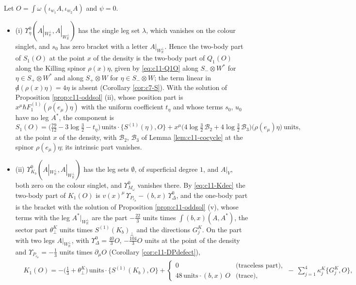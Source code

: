 \begin{proposition}
\label{prop:c11-SKbil}
Let $O=\int\omega\,(\iota_{w_1}A,\iota_{w_2}A)$ and $\psi=0$.
\begin{itemize}
\item (i) $\Upsilon^0_\eta(A|_{W_{\mathbb R}^\perp},A|_{W_{\mathbb R}^\perp})$ has the single leg set $\lambda$, which vanishes on the colour singlet, and $s_0$ has zero bracket with a letter $A|_{W_{\mathbb R}^\perp}$. Hence the two-body part of $S_1(O)$ at the point $x$ of the density is the two-body part of $Q_1(O)$ along the Killing spinor $\rho(x)\eta$, given by \eqref{eq:c11-Q1O} along $S_-\otimes W^*$ for $\eta\in S_+\otimes W^*$ and along $S_+\otimes W$ for $\eta\in S_-\otimes W$; the term linear in ${\not d}(\rho(x)\eta)=4\eta$ is absent (Corollary \ref{cor:c7-S}). With the solution of Proposition \ref{prop:c11-oddsol} (ii), whose position part is $x^\mu\hbar F_1^{(1)}(\rho(e_\mu)\eta)$ with the uniform coefficient $t_\eta$ and whose terms $s_0$, $u_0$ have no leg $A^*$, the component is
\[
S_1(O)=\big(\tfrac{79}{12}-3\log\tfrac32-t_\eta\big)\,\text{units}\cdot\{S^{(1)}(\eta),O\}+x^\mu\Big(4\log\tfrac32\,\mathcal B_2+4\log\tfrac32\,\mathcal B_3\Big)\big(\rho(e_\mu)\eta\big)\ \text{units},
\]
at the point $x$ of the density, with $\mathcal B_2$, $\mathcal B_3$ of Lemma \ref{lem:c11-cocycle} at the spinor $\rho(e_\mu)\eta$; its intrinsic part vanishes.
\item (ii) $\Upsilon^0_{K_b}(A|_{W_{\mathbb R}^\perp},A|_{W_{\mathbb R}^\perp})$ has the leg sets $\emptyset$, of superficial degree $1$, and $A|_V$, both zero on the colour singlet, and $\Upsilon^0_{M_\omega}$ vanishes there. By \eqref{eq:c11-Kdec} the two-body part of $K_1(O)$ is $v(x)^\mu\,\Upsilon_{P_{e_\mu}}-(b,x)\,\Upsilon^0_\Delta$, and the one-body part is the bracket with the solution of Proposition \ref{prop:c11-oddsol} (v), whose terms with the leg $A^*|_{W_{\mathbb R}^\perp}$ are the part $-\tfrac{22}3$ units times $\int(b,x)(A,A^*)$, the sector part $\theta^K_\perp$ units times $S^{(1)}(K_b)_\perp$ and the directions $G^K_j$. On the part with two legs $A|_{W_{\mathbb R}^\perp}$, with $\Upsilon^0_\Delta=\tfrac{40}3O$, $-\tfrac{104}3O$ units at the point of the density and $\Upsilon_{P_{e_\mu}}=-\tfrac13$ units times $\partial_\mu O$ (Corollary \ref{cor:c11-DPdefect}),
\[
\begin{aligned}
&K_1(O)=-\big(\tfrac13+\theta^K_\perp\big)\,\text{units}\cdot\{S^{(1)}(K_b),O\}+\begin{cases}0&\text{(traceless part)},\\ 48\,\text{units}\cdot(b,x)\,O&\text{(trace)},\end{cases}\ -\ \sum_{j=1}^4\kappa^K_j\{G^K_j,O\},\\

\end{aligned}\]
\end{itemize}
\end{proposition}
